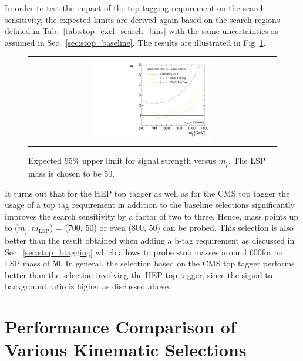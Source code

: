 In order to test the impact of the top tagging requirement on the search sensitivity, the expected limits are derived again based on the search regions defined in Tab.~\ref{tab:stop_excl_search_bins} with the same uncertainties as assumed in Sec.~\ref{sec:stop_baseline}. The results are illustrated in Fig~\ref{fig:stop_baselinetoptag_limit}. \\
\begin{figure}[!h]
  \centering
  \begin{tabular}{c}
                \includegraphics[width=0.49\textwidth]{figures/limitplot4BinSel_BaselineTopTag.pdf} 
  \end{tabular}
  \caption{Expected 95\% upper limit for signal strength versus $m_{\tilde{t}}$. The LSP mass is chosen to be 50\gev.}
  \label{fig:stop_baselinetoptag_limit}
\end{figure}

It turns out that for the HEP top tagger as well as for the CMS top tagger the usage of a top tag requirement in addition to the baseline selections significantly improves the search sensitivity by a factor of two to three. Hence, mass points up to ($m_{\tilde{t}}, m_\mathrm{LSP}$) = (700, 50) or even (800, 50) can be probed. This selection is also better than the result obtained when adding a b-tag requirement as discussed in Sec.~\ref{sec:stop_btagging} which allows to probe stop masses around 600\gev for an LSP mass of 50\gev. In general, the selection based on the CMS top tagger performs better than the selection involving the HEP top tagger, since the signal to background ratio is higher as discussed above.

\section{Performance Comparison of Various Kinematic Selections}
\label{sec:stop_cuts}

